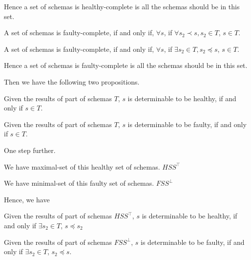 Hence a set of schemas is healthy-complete is all the schemas should be in this set.

\begin{definition}
A set of schemas is faulty-complete, if and only if, $\forall s$, if $ \forall s_{2} \prec s,  s_{2} \in T$, $s \in T$.
\end{definition}


\begin{definition}
A set of schemas is faulty-complete, if and only if, $\forall s$, if $ \exists s_{2} \in T,  s_{2} \preceq s$, $s \in T$.
\end{definition}


Hence a set of schemas is faulty-complete is all the schemas should be in this set.

Then we have the following two propositions.


\begin{proposition}\label{pro:determinableschemeashealthy}
Given the results of part of schemas $T$, $s$ is determinable to be healthy, if and only if $s \in T$.
\end{proposition}



\begin{proposition}\label{pro:determinableschemeasfaulty}
Given the results of part of schemas $T$, $s$ is determinable to be faulty, if and only if $s \in T$.
\end{proposition}


One step further. 

We have maximal-set of this healthy set of schemas.  $HSS^{\top}$ 

We have minimal-set of this faulty set of schemas.  $FSS^{\bot}$

Hence, we have 


\begin{proposition}\label{pro:determinableschemeashealthymax}
Given the results of part of schemas $HSS^{\top}$, $s$ is determinable to be healthy, if and only if $\exists s_{2} \in T$, $s \preceq s_{2}$
\end{proposition}



\begin{proposition}\label{pro:determinableschemeasfaultymin}
Given the results of part of schemas $FSS^{\bot}$, $s$ is determinable to be faulty, if and only if $\exists s_{2} \in T$, $s_{2} \preceq s$.
\end{proposition}




